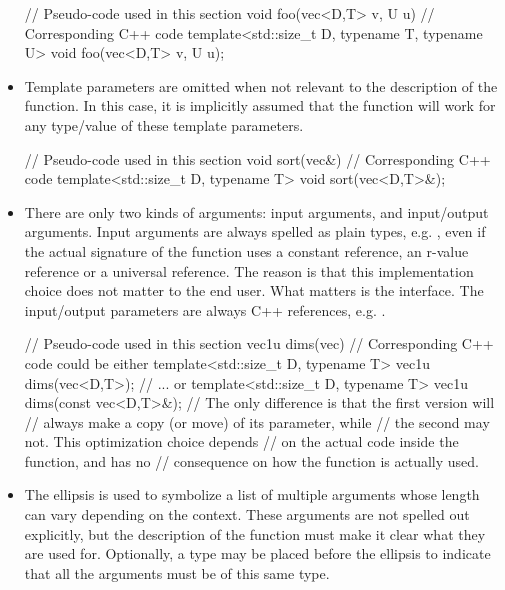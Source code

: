 \documentclass[12pt]{report}
\newenvironment{example}
{
    \begin{mdframed}[style=example,frametitle={Example}]
}
{
    \end{mdframed}
}
\begin{document}
\begin{itemize}
\begin{example}
\begin{cppcode}
// Pseudo-code used in this section
void foo(vec<D,T> v, U u)
// Corresponding C++ code
template<std::size_t D, typename T, typename U>
void foo(vec<D,T> v, U u);
\end{cppcode}
\end{example}

\item Template parameters are omitted when not relevant to the description of the function. In this case, it is implicitly assumed that the function will work for any type/value of these template parameters.

\begin{example}
\begin{cppcode}
// Pseudo-code used in this section
void sort(vec&)
// Corresponding C++ code
template<std::size_t D, typename T>
void sort(vec<D,T>&);
\end{cppcode}
\end{example}

\item There are only two kinds of arguments: input arguments, and input/output arguments. Input arguments are always spelled as plain types, e.g. , even if the actual signature of the function uses a constant reference, an r-value reference or a universal reference. The reason is that this implementation choice does not matter to the end user. What matters is the interface. The input/output parameters are always C++ references, e.g. .

\begin{example}
\begin{cppcode}
// Pseudo-code used in this section
vec1u dims(vec)
// Corresponding C++ code could be either
template<std::size_t D, typename T>
vec1u dims(vec<D,T>);
// ... or
template<std::size_t D, typename T>
vec1u dims(const vec<D,T>&);
// The only difference is that the first version will
// always make a copy (or move) of its parameter, while
// the second may not. This optimization choice depends
// on the actual code inside the function, and has no
// consequence on how the function is actually used.
\end{cppcode}
\end{example}

\item The ellipsis  is used to symbolize a list of multiple arguments whose length can vary depending on the context. These arguments are not spelled out explicitly, but the description of the function must make it clear what they are used for. Optionally, a type may be placed before the ellipsis to indicate that all the arguments must be of this same type.


\end{itemize}
\end{document}
